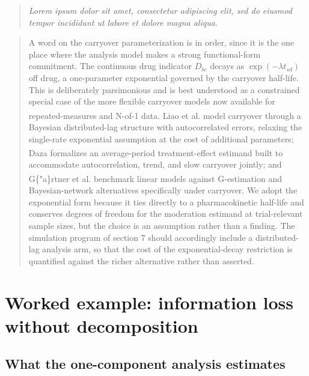 \documentclass[
  11pt,
]{article}
\newenvironment{rgt}{%
  \begin{quote}\small\itshape\color[RGB]{20,60,160}}{%
  \end{quote}}
\newenvironment{orig}{%
  \begin{quote}\normalsize\color[gray]{0.55}}{%
  \end{quote}}
\begin{document}
\begin{rgt}
Lorem ipsum dolor sit amet, consectetur adipiscing elit, sed do eiusmod tempor incididunt ut labore et dolore magna aliqua.

\end{rgt}

\begin{orig}
A word on the carryover parameterization is in order, since it
is the one place where the analysis model makes a strong
functional-form commitment. The continuous drug indicator
\(D_{bc}\) decays as \(\exp(-\lambda t_{sd})\) off drug, a
one-parameter exponential governed by the carryover half-life.
This is deliberately parsimonious and is best understood as a
constrained special case of the more flexible carryover models
now available for repeated-measures and N-of-1 data. Liao et al.\textsuperscript{} model carryover through a Bayesian distributed-lag
structure with autocorrelated errors, relaxing the single-rate
exponential assumption at the cost of additional parameters;
Daza\textsuperscript{} formalizes an average-period treatment-effect
estimand built to accommodate autocorrelation, trend, and slow
carryover jointly; and G\{"a\}rtner et al.\textsuperscript{}
benchmark linear models against G-estimation and Bayesian-network
alternatives specifically under carryover. We adopt the
exponential form because it ties directly to a pharmacokinetic
half-life and conserves degrees of freedom for the moderation
estimand at trial-relevant sample sizes, but the choice is an
assumption rather than a finding. The simulation
program of section 7 should accordingly include a
distributed-lag analysis arm, so that the cost of the
exponential-decay restriction is quantified against the richer
alternative rather than asserted.

\end{orig}

\section{Worked example: information loss without decomposition}\label{worked-example-information-loss-without-decomposition}

\subsection{What the one-component analysis estimates}\label{what-the-one-component-analysis-estimates}
\end{document}
